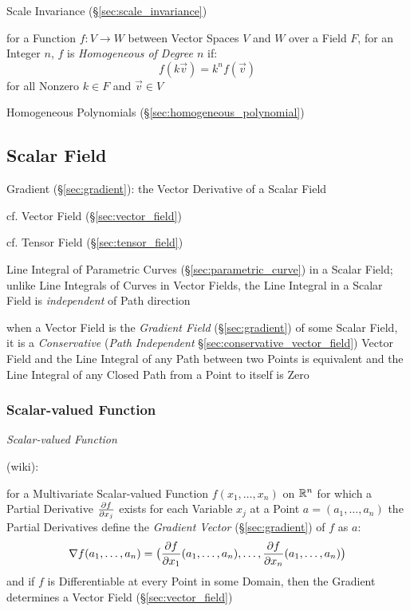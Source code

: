 Scale Invariance (\S\ref{sec:scale_invariance})

for a Function $f : V \rightarrow W$ between Vector Spaces $V$ and $W$ over a
Field $F$, for an Integer $n$, $f$ is \emph{Homogeneous of Degree $n$} if:
\[
  f(k{\vec{v}}) = k^n f(\vec{v})
\]
for all Nonzero $k \in F$ and $\vec{v} \in V$

Homogeneous Polynomials (\S\ref{sec:homogeneous_polynomial})



\subsection{Scalar Field}\label{sec:scalar_field}


Gradient (\S\ref{sec:gradient}): the Vector Derivative of a Scalar Field

cf. Vector Field (\S\ref{sec:vector_field})

cf. Tensor Field (\S\ref{sec:tensor_field})

Line Integral of Parametric Curves (\S\ref{sec:parametric_curve}) in a Scalar
Field; unlike Line Integrals of Curves in Vector Fields, the Line Integral in a
Scalar Field is \emph{independent} of Path direction

when a Vector Field is the \emph{Gradient Field} (\S\ref{sec:gradient}) of some
Scalar Field, it is a \emph{Conservative} (\emph{Path Independent}
\S\ref{sec:conservative_vector_field}) Vector Field and the Line Integral of
any Path between two Points is equivalent and the Line Integral of any Closed
Path from a Point to itself is Zero



\subsubsection{Scalar-valued Function}\label{sec:scalar_function}

\emph{Scalar-valued Function}

(wiki):

for a Multivariate Scalar-valued Function $f(x_1, \ldots, x_n)$ on $\mathbb{R}^n$
for which a Partial Derivative $\frac{\partial{f}}{\partial{x_j}}$ exists for each Variable $x_j$
at a Point $a = (a_1, \ldots, a_n)$ the Partial Derivatives define the
\emph{Gradient Vector} (\S\ref{sec:gradient}) of $f$ as $a$:
\[
  \nabla{f}(a_1, \ldots, a_n) = \big(
    \frac{\partial{f}}{\partial{x_1}}(a_1, \ldots, a_n), \ldots, \frac{\partial{f}}{\partial{x_n}}(a_1, \ldots, a_n)
  \big)
\]
and if $f$ is Differentiable at every Point in some Domain, then the Gradient
determines a Vector Field (\S\ref{sec:vector_field})



